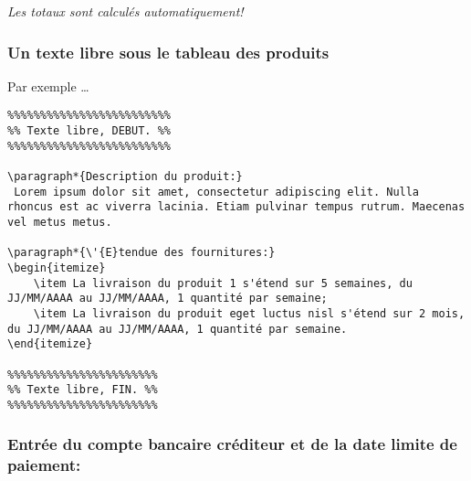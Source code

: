 \documentclass[a4paper,10pt]{article}
\begin{document}
\emph{Les totaux sont calculés automatiquement!}

\ctcurrency{\euro}


\begin{xcalctab}



\end{xcalctab}


\subsubsection{Un texte libre sous le tableau des produits}

Par exemple \ldots

\begin{lstlisting}
%%%%%%%%%%%%%%%%%%%%%%%%%
%% Texte libre, DEBUT. %%
%%%%%%%%%%%%%%%%%%%%%%%%%

\paragraph*{Description du produit:}
 Lorem ipsum dolor sit amet, consectetur adipiscing elit. Nulla rhoncus est ac viverra lacinia. Etiam pulvinar tempus rutrum. Maecenas vel metus metus. 

\paragraph*{\'{E}tendue des fournitures:}
\begin{itemize}
    \item La livraison du produit 1 s'étend sur 5 semaines, du JJ/MM/AAAA au JJ/MM/AAAA, 1 quantité par semaine;
    \item La livraison du produit eget luctus nisl s'étend sur 2 mois, du JJ/MM/AAAA au JJ/MM/AAAA, 1 quantité par semaine.
\end{itemize}

%%%%%%%%%%%%%%%%%%%%%%%
%% Texte libre, FIN. %%
%%%%%%%%%%%%%%%%%%%%%%%
\end{lstlisting}


\subsubsection{Entrée du compte bancaire créditeur et de la date limite de paiement:}
\end{document}
